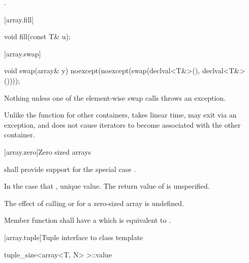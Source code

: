 \begin{itemdescr}
\pnum \returns {}.
\end{itemdescr}

[array.fill]{}

%
%
\begin{itemdecl}
void fill(const T& u);
\end{itemdecl}

\begin{itemdescr}
\pnum
\effects {}
\end{itemdescr}

[array.swap]{}

%
%
\begin{itemdecl}
void swap(array& y) noexcept(noexcept(swap(declval<T&>(), declval<T&>())));
\end{itemdecl}

\begin{itemdescr}
\pnum
\effects {}

\pnum
\throws Nothing unless one of the element-wise swap calls throws an exception.

\pnum
\realnote Unlike the  function for other containers, 
takes linear time, may exit via an exception, and does not cause iterators to
become associated with the other container.
\end{itemdescr}

[array.zero]{Zero sized arrays}

%
\pnum{} shall provide support for the special case .

\pnum In the case that ,  unique value.
The return value of  is unspecified.

\pnum
The effect of calling  or  for a zero-sized array is
undefined.

\pnum
Member function  shall have a 
which is equivalent to .

[array.tuple]{Tuple interface to class template }
%
%
%
%
\begin{itemdecl}
tuple_size<array<T, N> >::value
\end{itemdecl}

